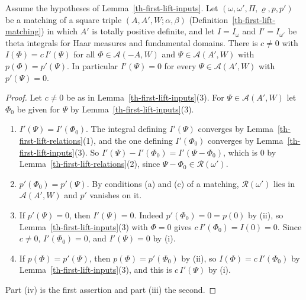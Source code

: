 \begin{lemma}\label{th-first-lift-comparison}
Assume the hypotheses of Lemma~\ref{th-first-lift-inputs}. Let
$(\omega,\omega',\Pi,\varrho,p,p')$ be a matching of a square triple
$(A,A',W;\alpha,\beta)$ (Definition~\ref{th-first-lift-matching}) in which
$A'$ is totally positive definite, and let $I=I_\omega$ and $I'=I_{\omega'}$ be
theta integrals for Haar measures and fundamental domains. There is $c\neq0$
with $I(\Phi)=c\,I'(\Psi)$ for all $\Phi\in\mathcal A(-A,W)$ and
$\Psi\in\mathcal A(A',W)$ with $p(\Phi)=p'(\Psi)$. In particular $I'(\Psi)=0$
for every $\Psi\in\mathcal A(A',W)$ with $p'(\Psi)=0$.
\end{lemma}
\begin{proof}
Let $c\neq0$ be as in Lemma~\ref{th-first-lift-inputs}(3). For
$\Psi\in\mathcal A(A',W)$ let $\Phi_0$ be given for $\Psi$ by
Lemma~\ref{th-first-lift-inputs}(3).
\begin{enumerate}
\item[(i)] $I'(\Psi)=I'(\Phi_0)$. The integral defining $I'(\Psi)$ converges by
  Lemma~\ref{th-first-lift-relations}(1), and the one defining $I'(\Phi_0)$
  converges by Lemma~\ref{th-first-lift-inputs}(3). So
  $I'(\Psi)-I'(\Phi_0)=I'(\Psi-\Phi_0)$, which is $0$ by
  Lemma~\ref{th-first-lift-relations}(2), since
  $\Psi-\Phi_0\in\mathcal R(\omega')$.
\item[(ii)] $p'(\Phi_0)=p'(\Psi)$. By conditions (a) and (c) of a matching,
  $\mathcal R(\omega')$ lies in $\mathcal A(A',W)$ and $p'$ vanishes on it.
\item[(iii)] If $p'(\Psi)=0$, then $I'(\Psi)=0$. Indeed $p'(\Phi_0)=0=p(0)$ by
  (ii), so Lemma~\ref{th-first-lift-inputs}(3) with $\Phi=0$ gives
  $c\,I'(\Phi_0)=I(0)=0$. Since $c\neq0$, $I'(\Phi_0)=0$, and $I'(\Psi)=0$
  by (i).
\item[(iv)] If $p(\Phi)=p'(\Psi)$, then $p(\Phi)=p'(\Phi_0)$ by (ii), so
  $I(\Phi)=c\,I'(\Phi_0)$ by Lemma~\ref{th-first-lift-inputs}(3), and this is
  $c\,I'(\Psi)$ by (i).
\end{enumerate}
Part (iv) is the first assertion and part (iii) the second.
\end{proof}

